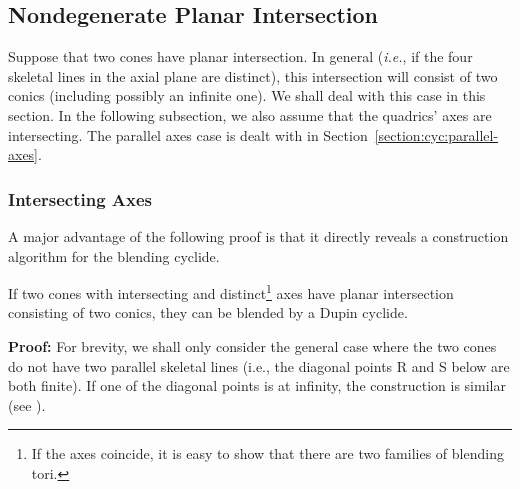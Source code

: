
\subsection{Nondegenerate Planar Intersection}
\label{ssection:nondegn}

Suppose that two cones have planar intersection.  
In general ({\it i.e.}, if the four skeletal lines in the axial plane
are distinct), this intersection will consist of two conics
(including possibly an infinite one).
We shall deal with this case in this section.  
In the following subsection, 
we also assume that the quadrics' axes are intersecting.
The parallel axes case is dealt with in 
Section~\ref{section:cyc:parallel-axes}.

\subsubsection{Intersecting Axes}
\label{section:intersecting-axes}

A major advantage of the following proof is that it directly reveals
a construction algorithm for the blending cyclide.

\begin{lemma}
\label{lemma:int-cyclide}
If two cones with intersecting and distinct\footnote{If the axes coincide, 
	it is easy to show that there are two families of
	blending tori.}
axes have planar intersection consisting of two conics, they can be blended
by a Dupin cyclide.
\end{lemma}
{\bf Proof:}
For brevity, we shall only consider the general case where the two cones
do not have two parallel skeletal lines
(i.e., the diagonal points R and S below are both finite).
If one of the diagonal points is at infinity, the construction is similar
(see \cite[Lemma~5.13]{shenethesis}).

